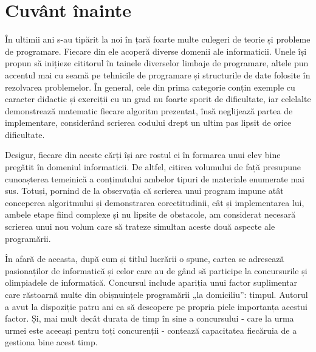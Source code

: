 \chapter*{Cuvânt înainte}

În ultimii ani s-au tipărit la noi în țară foarte multe culegeri de teorie și
probleme de programare. Fiecare din ele acoperă diverse domenii ale
informaticii. Unele își propun să inițieze cititorul în tainele diverselor
limbaje de programare, altele pun accentul mai cu seamă pe tehnicile de
programare și structurile de date folosite în rezolvarea problemelor. În
general, cele din prima categorie conțin exemple cu caracter didactic și
exerciții cu un grad nu foarte sporit de dificultate, iar celelalte
demonstrează matematic fiecare algoritm prezentat, însă neglijează partea de
implementare, considerând scrierea codului drept un ultim pas lipsit de orice
dificultate.

Desigur, fiecare din aceste cărți își are rostul ei în formarea unui elev bine
pregătit în domeniul informaticii. De altfel, citirea volumului de față
presupune cunoașterea temeinică a conținutului ambelor tipuri de materiale
enumerate mai sus. Totuși, pornind de la observația că scrierea unui program
impune atât conceperea algoritmului și demonstrarea corectitudinii, cât și
implementarea lui, ambele etape fiind complexe și nu lipsite de obstacole, am
considerat necesară scrierea unui nou volum care să trateze simultan aceste
două aspecte ale programării.

În afară de aceasta, după cum și titlul lucrării o spune, cartea se adresează
pasionaților de informatică și celor care au de gând să participe la
concursurile și olimpiadele de informatică. Concursul include apariția unui
factor suplimentar care răstoarnă multe din obișnuințele programării „la
domiciliu”: timpul. Autorul a avut la dispoziție patru ani ca să descopere pe
propria piele importanța acestui factor. Și, mai mult decât durata de timp în
sine a concursului - care la urma urmei este aceeași pentru toți concurenții -
contează capacitatea fiecăruia de a gestiona bine acest timp.

